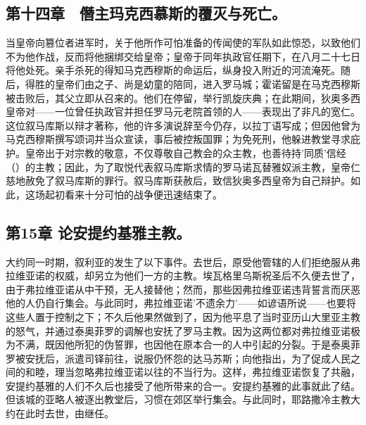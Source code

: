 
\subsection{第十四章　僭主玛克西慕斯的覆灭与死亡。}

当皇帝向篡位者进军时，关于他所作可怕准备的传闻使的军队如此惊恐，以致他们不为他作战，反而将他捆绑交给皇帝；皇帝于同年执政官任期下，在八月二十七日将他处死。亲手杀死的得知马克西穆斯的命运后，纵身投入附近的河流淹死。随后，得胜的皇帝们由之子、尚是幼童的陪同，进入罗马城；霍诺留是在马克西穆斯被击败后，其父立即从召来的。他们在停留，举行凯旋庆典；在此期间，狄奥多西皇帝对——一位曾任执政官并担任罗马元老院首领的人——表现出了非凡的宽仁。这位叙马库斯以辩才著称，他的许多演说辞至今仍存，以拉丁语写成；但因他曾为马克西穆斯撰写颂词并当众宣读，事后被控叛国罪；为免死刑，他躲进教堂寻求庇护。皇帝出于对宗教的敬意，不仅尊敬自己教会的众主教，也善待持'同质'信经（）的主教；因此，为了取悦代表叙马库斯求情的罗马诺瓦替雅奴派主教，皇帝仁慈地赦免了叙马库斯的罪行。叙马库斯获赦后，致信狄奥多西皇帝为自己辩护。如此，这场起初看来十分可怕的战争便迅速结束了。\par


\subsection{第15章 论安提约基雅主教。}

大约同一时期，叙利亚的发生了以下事件。去世后，原受他管辖的人们拒绝服从弗拉维亚诺的权威，却另立为他们一方的主教。埃瓦格里乌斯祝圣后不久便去世了，由于弗拉维亚诺从中干预，无人接替他；然而，那些因弗拉维亚诺违背誓言而厌恶他的人仍自行集会。与此同时，弗拉维亚诺'不遗余力'——如谚语所说——也要将这些人置于控制之下；不久后他果然做到了，因为他平息了当时亚历山大里亚主教的怒气，并通过泰奥菲罗的调解也安抚了罗马主教。因为这两位都对弗拉维亚诺极为不满，既因他所犯的伪誓罪，也因他在原本合一的人中引起的分裂。于是泰奥菲罗被安抚后，派遣司铎前往，说服仍怀怨的达马苏斯；向他指出，为了促成人民之间的和睦，理当忽略弗拉维亚诺以往的不当行为。这样，弗拉维亚诺恢复了共融，安提约基雅的人们不久后也接受了他所带来的合一。安提约基雅的此事就此了结。但该城的亚略人被逐出教堂后，习惯在郊区举行集会。与此同时，耶路撒冷主教大约在此时去世，由继任。\par

